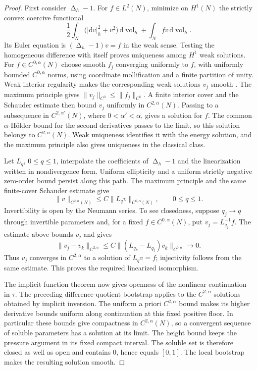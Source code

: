 \documentclass[11pt]{article}
\numberwithin{equation}{section}
\theoremstyle{definition}
\theoremstyle{remark}
\begin{document}
\begin{proof}
First consider $\operatorname{\Delta}_h-1$.  For $f\in L^2(N)$, minimize on $H^1(N)$
the strictly convex coercive functional
\[
 \frac12\int_N\bigl(|\mathrm d v|_h^2+v^2\bigr)
                 \,\mathrm d\operatorname{vol}_h
 +\int_N fv\,\mathrm d\operatorname{vol}_h.
\]
Its Euler equation is $(\operatorname{\Delta}_h-1)v=f$ in the weak sense.
Testing the homogeneous difference with itself proves uniqueness
among $H^1$ weak solutions.
For $f\in C^{0,\alpha}(N)$ choose smooth $f_j$ converging uniformly
to $f$, with uniformly bounded $C^{0,\alpha}$ norms, using coordinate
mollification and a finite partition of unity.  Weak interior
regularity makes the corresponding weak solutions $v_j$ smooth
\citep[Lecture~6, Theorem~1 and Corollary~1]{simonPDE}.
The maximum principle gives $\|v_j\|_{C^0}\le\|f_j\|_{C^0}$.
A finite interior cover and the Schauder estimate
\citep[Lecture~12, Theorem~2]{simonPDE} then bound $v_j$ uniformly
in $C^{2,\alpha}(N)$.  Passing to a subsequence in
$C^{2,\alpha'}(N)$, where $0<\alpha'<\alpha$, gives a solution for $f$.
The common $\alpha$-H\"older bound for the second derivatives passes
to the limit, so this solution belongs to $C^{2,\alpha}(N)$.
Weak uniqueness identifies it with the energy solution, and the
maximum principle also gives uniqueness in the classical class.

Let $L_q$, $0\le q\le1$, interpolate the coefficients of
$\operatorname{\Delta}_h-1$ and the linearization written in nondivergence form.
Uniform ellipticity and a uniform
strictly negative zero-order bound persist along this path.  The
maximum principle and the same finite-cover Schauder estimate give
\[
 \|v\|_{C^{2,\alpha}(N)}
 \le C\|L_qv\|_{C^{0,\alpha}(N)},
 \qquad 0\le q\le1.
\]
Invertibility is open by the Neumann series.  To see closedness,
suppose $q_j\to q$ through invertible parameters and, for a fixed
$f\in C^{0,\alpha}(N)$, put $v_j=L_{q_j}^{-1}f$.
The estimate above bounds $v_j$ and gives
\[
 \|v_j-v_k\|_{C^{2,\alpha}}
 \le C\|(L_{q_k}-L_{q_j})v_k\|_{C^{0,\alpha}}
 \longrightarrow0.
\]
Thus $v_j$ converges in $C^{2,\alpha}$ to a solution of
$L_qv=f$; injectivity follows from the same estimate.
This proves the required linearized isomorphism.

The implicit function theorem now gives openness of the nonlinear
continuation in $\tau$.  The preceding difference-quotient bootstrap
applies to the $C^{2,\alpha}$ solutions obtained by implicit inversion.
The uniform a priori $C^{2,\alpha}$ bound makes its higher derivative
bounds uniform along continuation at this fixed positive floor.
In particular these bounds give compactness in
$C^{2,\alpha}(N)$, so a convergent sequence of soluble parameters
has a solution at its limit.  The height bound keeps the pressure
argument in its fixed compact interval.  The soluble set is therefore
closed as well as open and contains $0$, hence equals $[0,1]$.
The local bootstrap makes the resulting solution smooth.
\end{proof}
\end{document}
